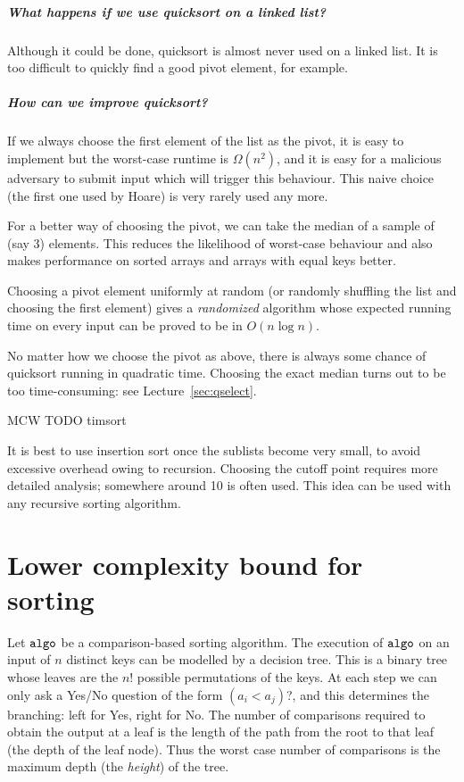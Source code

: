 \paragraph{What happens if we  use quicksort on a linked list?}
Although it could be done, quicksort is almost never used on a linked list. It is too difficult to quickly find a good pivot element, for example.

\paragraph{How can we improve quicksort?}

If we always choose the first element of the list as the pivot, it is easy to implement but
the worst-case runtime is $\Omega(n^2)$, and it is easy for a malicious adversary to submit input 
which will trigger this behaviour. This naive choice (the first one used by Hoare) is very rarely used any more.

For a better way of choosing the pivot, we can take the median of a sample of (say 3) elements. This reduces the 
likelihood of worst-case behaviour and also makes performance on sorted arrays 
and arrays with equal keys better. 

Choosing a pivot element uniformly at random (or randomly shuffling the list and choosing the first element) 
gives a \emph{randomized} 
algorithm whose expected running time on every input can be proved to be in 
$O(n \log n)$. 

No matter how we choose the pivot as above, there is always some chance of quicksort running in quadratic time. Choosing the exact median turns out to be too time-consuming: see Lecture~\ref{sec:qselect}.

MCW TODO  timsort

It is best to use insertion sort once the sublists become very small, to 
avoid excessive overhead owing to recursion. Choosing the cutoff point requires 
more detailed analysis; somewhere around 10 is often used. This idea can be used with any recursive sorting algorithm.

\chapter{Lower complexity bound for sorting} %
\label{sec:lowerbound}


Let $\algo$ be a comparison-based sorting algorithm. The execution
of $\algo$ on an input of $n$ distinct keys can be modelled by a
{decision tree}. This is a binary tree whose leaves are the
$n!$ possible permutations of the keys. At each step we can only ask a Yes/No 
question of the form $(a_i < a_j)$?, and this determines the branching: left for
 Yes, right for No. The number of comparisons required to obtain the output at a leaf is the 
length of the path from the root to that leaf (the {depth} of the leaf 
node). Thus the worst case number of comparisons is the maximum depth (the \emph{height}) of the tree.

